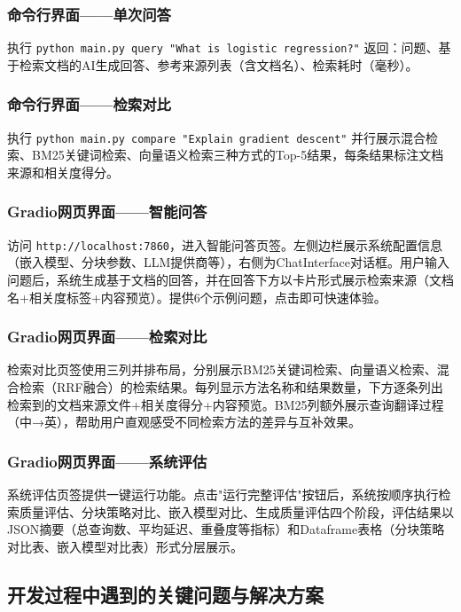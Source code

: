 \documentclass[10pt,a4paper]{article}
\begin{document}
\subsubsection{命令行界面——单次问答}

执行 \texttt{python main.py query "What is logistic regression?"} 返回：问题、基于检索文档的AI生成回答、参考来源列表（含文档名）、检索耗时（毫秒）。

\subsubsection{命令行界面——检索对比}

执行 \texttt{python main.py compare "Explain gradient descent"} 并行展示混合检索、BM25关键词检索、向量语义检索三种方式的Top-5结果，每条结果标注文档来源和相关度得分。

\subsubsection{Gradio网页界面——智能问答}

访问 \texttt{http://localhost:7860}，进入智能问答页签。左侧边栏展示系统配置信息（嵌入模型、分块参数、LLM提供商等），右侧为ChatInterface对话框。用户输入问题后，系统生成基于文档的回答，并在回答下方以卡片形式展示检索来源（文档名+相关度标签+内容预览）。提供6个示例问题，点击即可快速体验。

\subsubsection{Gradio网页界面——检索对比}

检索对比页签使用三列并排布局，分别展示BM25关键词检索、向量语义检索、混合检索（RRF融合）的检索结果。每列显示方法名称和结果数量，下方逐条列出检索到的文档来源文件+相关度得分+内容预览。BM25列额外展示查询翻译过程（中→英），帮助用户直观感受不同检索方法的差异与互补效果。

\subsubsection{Gradio网页界面——系统评估}

系统评估页签提供一键运行功能。点击"运行完整评估"按钮后，系统按顺序执行检索质量评估、分块策略对比、嵌入模型对比、生成质量评估四个阶段，评估结果以JSON摘要（总查询数、平均延迟、重叠度等指标）和Dataframe表格（分块策略对比表、嵌入模型对比表）形式分层展示。

\subsection{开发过程中遇到的关键问题与解决方案}
\end{document}
